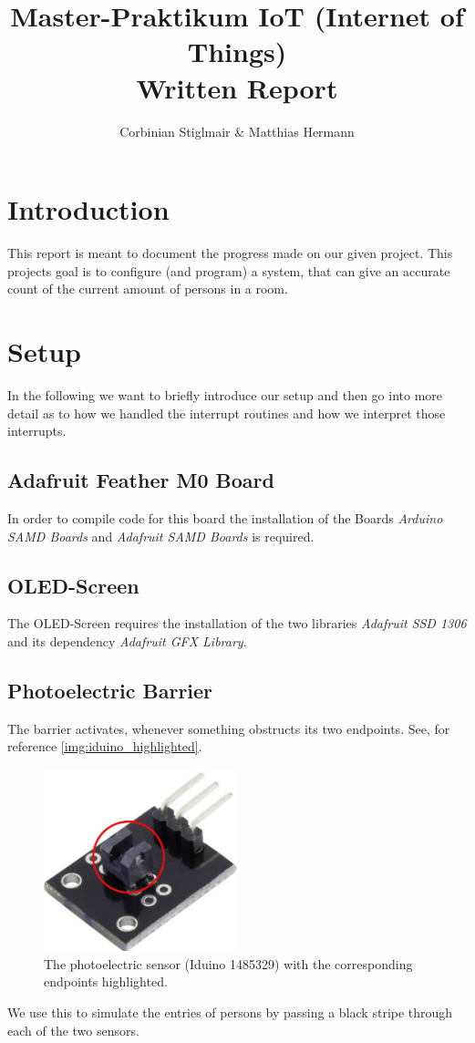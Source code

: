 \documentclass[]{article}
\title{Master-Praktikum IoT (Internet of Things)\\Written Report}
\author{Corbinian Stiglmair \& Matthias Hermann}
\begin{document}
\maketitle
\newpage
\tableofcontents
\newpage

\begin{sloppypar}
\section{Introduction}
This report is meant to document the progress made on our given project. This projects goal is to configure (and program) a system, that can give an accurate count of the current amount of persons in a room.
\section{Setup}
In the following we want to briefly introduce our setup and then go into more detail as to how we handled the interrupt routines and how we interpret those interrupts.
\subsection{Adafruit Feather M0 Board}
In order to compile code for this board the installation of the Boards \textit{Arduino SAMD Boards} and \textit{Adafruit SAMD Boards} is required.
\subsection{OLED-Screen}
The OLED-Screen requires the installation of the two libraries \textit{Adafruit SSD 1306} and its dependency \textit{Adafruit GFX Library}.
\subsection{Photoelectric Barrier}
The barrier activates, whenever something obstructs its two endpoints. See, for reference \eqref{img:iduino_highlighted}.\\
\begin{figure}[p]
	\centering
	\includegraphics[width=0.5\textwidth, keepaspectratio]{./images/iduino_highlighted.png}
	\caption{The photoelectric sensor (Iduino 1485329) with the corresponding endpoints highlighted.}\label{img:iduino_highlighted}
\end{figure}	
We use this to simulate the entries of persons by passing a black stripe through each of the two sensors.

\end{sloppypar}
\end{document}
